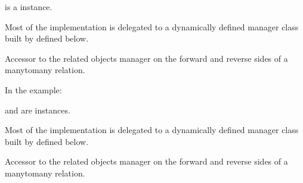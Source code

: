 \documentclass[letterpaper,10pt,english]{sphinxmanual}
\begin{document}
\begin{fulllineitems}
\begin{fulllineitems}
\sphinxAtStartPar
{} is a  instance.

\sphinxAtStartPar
Most of the implementation is delegated to a dynamically defined manager
class built by  defined below.

\end{fulllineitems}


\begin{fulllineitems}
\label{\detokenize{models/course:api.models.course.Course.usertocoursetaken}}
\pysigstartsignatures
{}
\pysigstopsignatures
\sphinxAtStartPar
Accessor to the related objects manager on the forward and reverse sides of
a many\sphinxhyphen{}to\sphinxhyphen{}many relation.

\sphinxAtStartPar
In the example:

\begin{sphinxVerbatim}[commandchars=\\\{\}]
 
       
\end{sphinxVerbatim}

\sphinxAtStartPar
{} and  are 
instances.

\sphinxAtStartPar
Most of the implementation is delegated to a dynamically defined manager
class built by  defined below.

\end{fulllineitems}


\begin{fulllineitems}
\label{\detokenize{models/course:api.models.course.Course.usertocoursetutored}}
\pysigstartsignatures
{}
\pysigstopsignatures
\sphinxAtStartPar
Accessor to the related objects manager on the forward and reverse sides of
a many\sphinxhyphen{}to\sphinxhyphen{}many relation.


\end{fulllineitems}
\end{fulllineitems}
\end{document}
